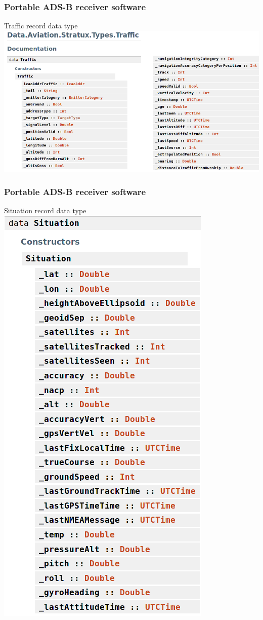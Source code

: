 \begin{frame}
\frametitle{Portable ADS-B receiver software}
\begin{block}{Traffic record data type}
\includegraphics[height=0.6\textheight]{image/stratux-traffic-record.png}
\end{block}
\end{frame}

\begin{frame}
\frametitle{Portable ADS-B receiver software}
\begin{block}{Situation record data type}
\includegraphics[height=0.6\textheight]{image/stratux-situation-record.png}
\end{block}
\end{frame}

